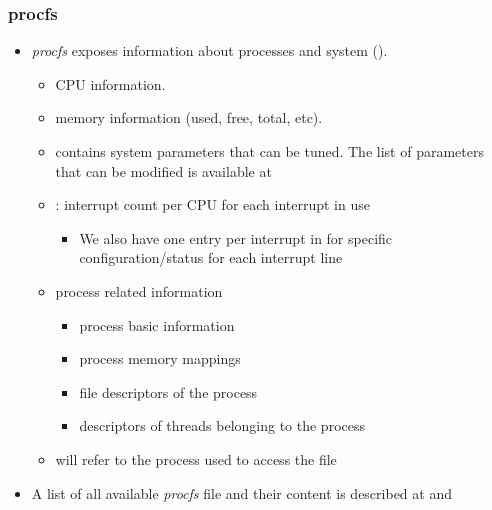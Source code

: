 \begin{frame}
  \frametitle{procfs}
  \begin{itemize}
    \item {\em procfs} exposes information about processes and system
          ().
    \begin{itemize}
      \item {} CPU information.
      \item {} memory information (used, free, total, etc).
      \item {} contains system parameters that can be tuned. The
            list of parameters that can be modified is available at
      \item {}: interrupt count per CPU for each interrupt
      in use
      \begin {itemize}
        \item We also have one entry per interrupt in  for
        specific configuration/status for each interrupt line
      \end {itemize}
      \item {} process related information
      \begin{itemize}
        \item{} process basic information
        \item {} process memory mappings
        \item {} file descriptors of the process
        \item {} descriptors of threads belonging
          to the process
      \end{itemize}
      \item {} will refer to the process used to access the file
    \end{itemize}
    \item A list of all available {\em procfs} file and their content is
          described at  and 
  \end{itemize}
\end{frame}

